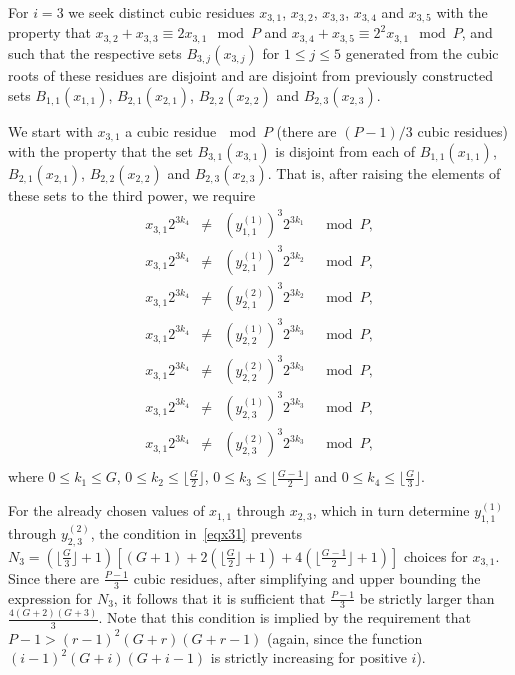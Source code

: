 For $i=3$ we seek distinct cubic residues $x_{3,1}$, $x_{3,2}$,
$x_{3,3}$, $x_{3,4}$ and $x_{3,5}$ with the property that $x_{3,2}+
x_{3,3} \equiv 2x_{3,1} \mod P$ and $x_{3,4}+ x_{3,5} \equiv
2^2x_{3,1} \mod P$, and such that the respective sets
$B_{3,j}(x_{3,j})$ for $1 \leq j \leq 5$ generated from the cubic
roots of these residues are disjoint and are disjoint from
previously constructed sets $B_{1,1}(x_{1,1})$, $B_{2,1}(x_{2,1})$,
$B_{2,2}(x_{2,2})$ and $B_{2,3}(x_{2,3})$.


We start with $x_{3,1}$ a cubic residue$~\mod P$ (there are
$(P-1)/3$ cubic residues) with the property that the set
$B_{3,1}(x_{3,1})$ is disjoint from each of $B_{1,1}(x_{1,1})$,
$B_{2,1}(x_{2,1})$, $B_{2,2}(x_{2,2})$ and $B_{2,3}(x_{2,3})$. That
is, after raising the elements of these sets to the third power, we
require
\begin{equation}\label{eqx31}\begin{array}{cccc}
x_{3,1}2^{3k_4} &\neq& (y_{1,1}^{(1)})^3 2^{3k_1} &\mod P, \\
x_{3,1}2^{3k_4} &\neq& (y_{2,1}^{(1)})^3 2^{3k_2} &\mod P, \\
x_{3,1}2^{3k_4} &\neq& (y_{2,1}^{(2)})^3 2^{3k_2} &\mod P, \\
x_{3,1}2^{3k_4} &\neq& (y_{2,2}^{(1)})^3 2^{3k_3} &\mod P, \\
x_{3,1}2^{3k_4} &\neq& (y_{2,2}^{(2)})^3 2^{3k_3} &\mod P, \\
x_{3,1}2^{3k_4} &\neq& (y_{2,3}^{(1)})^3 2^{3k_3} &\mod P, \\
x_{3,1}2^{3k_4} &\neq& (y_{2,3}^{(2)})^3 2^{3k_3} &\mod P, \\
\end{array}\end{equation}
where $0 \leq k_1 \leq G$, $0 \leq k_2 \leq \lfloor \frac{G}{2}
\rfloor$, $0 \leq k_3 \leq \lfloor\frac{G-1}{2} \rfloor$ and $0 \leq
k_4 \leq \lfloor\frac{G}{3} \rfloor$.

For the already chosen values of $x_{1,1}$ through $x_{2,3}$, which
in turn determine $y_{1,1}^{(1)}$ through $y_{2,3}^{(2)}$, the
condition in~\eqref{eqx31} prevents $N_3= \left(\lfloor \frac{G}{3}
\rfloor +1 \right)\left[ (G+1)+2\left(\lfloor \frac{G}{2} \rfloor +1
\right) +4\left(\lfloor \frac{G-1}{2} \rfloor +1 \right)\right]$
choices for $x_{3,1}$. Since there are $\frac{P-1}{3}$ cubic
residues, after simplifying and upper bounding the expression for
$N_3$, it follows that it is sufficient that $\frac{P-1}{3}$ be
strictly larger than $\frac{4(G+2)(G+3)}{3}$. Note that this
condition is implied by the requirement that $P-1>
(r-1)^2(G+r)(G+r-1)$ (again, since the function
$(i-1)^2(G+i)(G+i-1)$ is strictly increasing for positive $i$).

